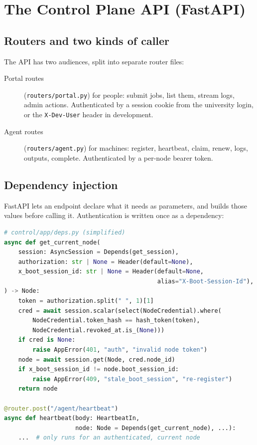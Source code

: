\section{The Control Plane API (FastAPI)}

\subsection{Routers and two kinds of caller}

The API has two audiences, split into separate router files:

\begin{description}
\item[Portal routes] (\texttt{routers/portal.py}) for people: submit jobs,
  list them, stream logs, admin actions. Authenticated by a session cookie from
  the university login, or the \texttt{X-Dev-User} header in development.
\item[Agent routes] (\texttt{routers/agent.py}) for machines: register,
  heartbeat, claim, renew, logs, outputs, complete. Authenticated by a
  per-node bearer token.
\end{description}

\subsection{Dependency injection}

FastAPI lets an endpoint declare what it needs as parameters, and builds those
values before calling it. Authentication is written once as a dependency:

\begin{lstlisting}[language=Python]
# control/app/deps.py (simplified)
async def get_current_node(
    session: AsyncSession = Depends(get_session),
    authorization: str | None = Header(default=None),
    x_boot_session_id: str | None = Header(default=None,
                                           alias="X-Boot-Session-Id"),
) -> Node:
    token = authorization.split(" ", 1)[1]
    cred = await session.scalar(select(NodeCredential).where(
        NodeCredential.token_hash == hash_token(token),
        NodeCredential.revoked_at.is_(None)))
    if cred is None:
        raise AppError(401, "auth", "invalid node token")
    node = await session.get(Node, cred.node_id)
    if x_boot_session_id != node.boot_session_id:
        raise AppError(409, "stale_boot_session", "re-register")
    return node

@router.post("/agent/heartbeat")
async def heartbeat(body: HeartbeatIn,
                    node: Node = Depends(get_current_node), ...):
    ...  # only runs for an authenticated, current node
\end{lstlisting}

